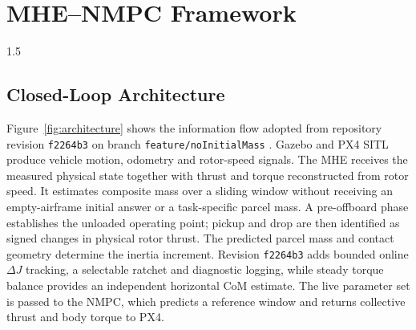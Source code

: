 \chapter{MHE--NMPC Framework}
\label{ch:framework}
\begin{spacing}{1.5}
\setlength{\parskip}{0.22in}

\section{Closed-Loop Architecture}

Figure~\ref{fig:architecture} shows the information flow adopted from repository revision \texttt{f2264b3} on branch \texttt{feature/noInitialMass} \cite{yoyo2026mhenmpc}. Gazebo and PX4 SITL produce vehicle motion, odometry and rotor-speed signals. The MHE receives the measured physical state together with thrust and torque reconstructed from rotor speed. It estimates composite mass over a sliding window without receiving an empty-airframe initial answer or a task-specific parcel mass. A pre-offboard phase establishes the unloaded operating point; pickup and drop are then identified as signed changes in physical rotor thrust. The predicted parcel mass and contact geometry determine the inertia increment. Revision \texttt{f2264b3} adds bounded online $\Delta J$ tracking, a selectable ratchet and diagnostic logging, while steady torque balance provides an independent horizontal CoM estimate. The live parameter set is passed to the NMPC, which predicts a reference window and returns collective thrust and body torque to PX4.


\end{spacing}
